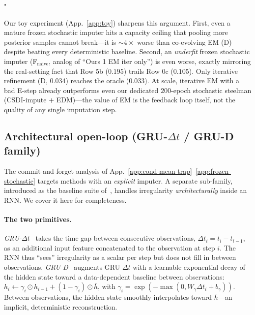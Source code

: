 "\documentclass{article}
\theoremstyle{plain}
\theoremstyle{definition}
\theoremstyle{remark}
\begin{document}
Our toy experiment (App.~\ref{app:toy}) sharpens this argument. First, even a mature frozen stochastic imputer hits a capacity ceiling that pooling more posterior samples cannot break---it is $\sim 4\times$ worse than co-evolving EM (D) despite beating every deterministic baseline. Second, an \emph{underfit} frozen stochastic imputer (F$_{\mathrm{naive}}$, analog of ``Ours 1 EM iter only'') is even worse, exactly mirroring the real-setting fact that Row $5$b ($0.195$) trails Row $0$c ($0.105$). Only iterative refinement (D, $0.034$) reaches the oracle ($0.033$). At scale, iterative EM with a bad E-step already outperforms even our dedicated $200$-epoch stochastic steelman (CSDI-impute $+$ EDM)---the value of EM is the feedback loop itself, not the quality of any single imputation step.

\subsection{Architectural open-loop (GRU-$\Delta t$ / GRU-D family)}
\label{app:architectural-openloop}

The commit-and-forget analysis of App.~\ref{app:cond-mean-trap}--\ref{app:frozen-stochastic} targets methods with an \emph{explicit} imputer. A separate sub-family, introduced as the baseline suite of~\citet{jeon2022gtgan}, handles irregularity \emph{architecturally} inside an RNN. We cover it here for completeness.

\paragraph{The two primitives.}
\emph{GRU-$\Delta t$}~\citep{che2018recurrent} takes the time gap between consecutive observations, $\Delta t_i = t_i - t_{i-1}$, as an additional input feature concatenated to the observation at step $i$. The RNN thus ``sees'' irregularity as a scalar per step but does not fill in between observations. \emph{GRU-D}~\citep{che2018recurrent} augments GRU-$\Delta t$ with a learnable exponential decay of the hidden state toward a data-dependent baseline between observations: $h_i \leftarrow \gamma_i \odot h_{i-1} + (1 - \gamma_i) \odot \bar{h}$, with $\gamma_i = \exp(-\max(0, W_\gamma \Delta t_i + b_\gamma))$. Between observations, the hidden state smoothly interpolates toward $\bar{h}$---an implicit, deterministic reconstruction.
\end{document}
